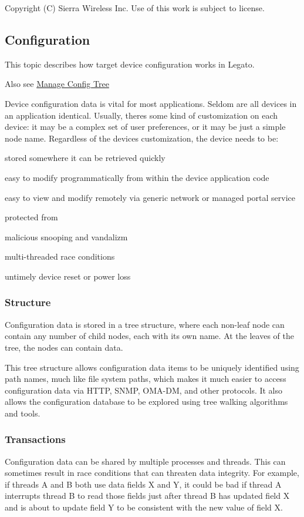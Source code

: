 Copyright (C) Sierra Wireless Inc. Use of this work is subject to license. \hypertarget{basicConfig}{}\subsection{Configuration}\label{basicConfig}
This topic describes how target device configuration works in Legato.

Also see \hyperlink{howToConfigTree}{Manage Config Tree}





Device configuration data is vital for most applications. Seldom are all devices in an application identical. Usually, there\textquotesingle{}s some kind of customization on each device\+: it may be a complex set of user preferences, or it may be just a simple node name. Regardless of the device\textquotesingle{}s customization, the device needs to be\+:
\begin{DoxyItemize}
\item stored somewhere it can be retrieved quickly
\item easy to modify programmatically from within the device application code
\item easy to view and modify remotely via generic network or managed portal service
\item protected from
\begin{DoxyItemize}
\item malicious snooping and vandalizm
\item multi-\/threaded race conditions
\item untimely device reset or power loss
\end{DoxyItemize}
\end{DoxyItemize}\hypertarget{basic_config_Tree}{}\subsubsection{Structure}\label{basic_config_Tree}
Configuration data is stored in a tree structure, where each non-\/leaf node can contain any number of child nodes, each with its own name. At the leaves of the tree, the nodes can contain data.

This tree structure allows configuration data items to be uniquely identified using path names, much like file system paths, which makes it much easier to access configuration data via H\+T\+T\+P, S\+N\+M\+P, O\+M\+A-\/\+D\+M, and other protocols. It also allows the configuration database to be explored using tree walking algorithms and tools.\hypertarget{basic_config_Transactions}{}\subsubsection{Transactions}\label{basic_config_Transactions}
Configuration data can be shared by multiple processes and threads. This can sometimes result in race conditions that can threaten data integrity. For example, if threads A and B both use data fields X and Y, it could be bad if thread A interrupts thread B to read those fields just after thread B has updated field X and is about to update field Y to be consistent with the new value of field X.

